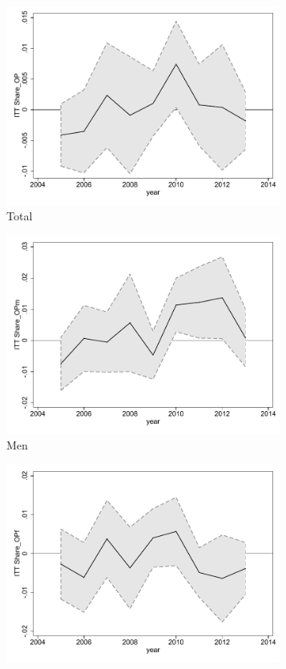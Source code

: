 \documentclass[a4paper ]{article}
\begin{document}
\begin{figure}[h!]
	\centering
	\begin{subfigure}[t]{0.31\textwidth}
		\centering
		\includegraphics[width=0.99\textwidth]{R1_LC_Share_OP}
		\caption{Total}		
	\end{subfigure}
	\begin{subfigure}[t]{0.31\textwidth}
		\centering
		\includegraphics[width=0.99\textwidth]{R1_LC_Share_OPm}
		\caption{Men}		
	\end{subfigure}
	\quad
	\begin{subfigure}[t]{0.31\textwidth}
		\centering
		\includegraphics[width=0.99\textwidth]{R1_LC_Share_OPf}

\end{subfigure}
\end{figure}
\end{document}
